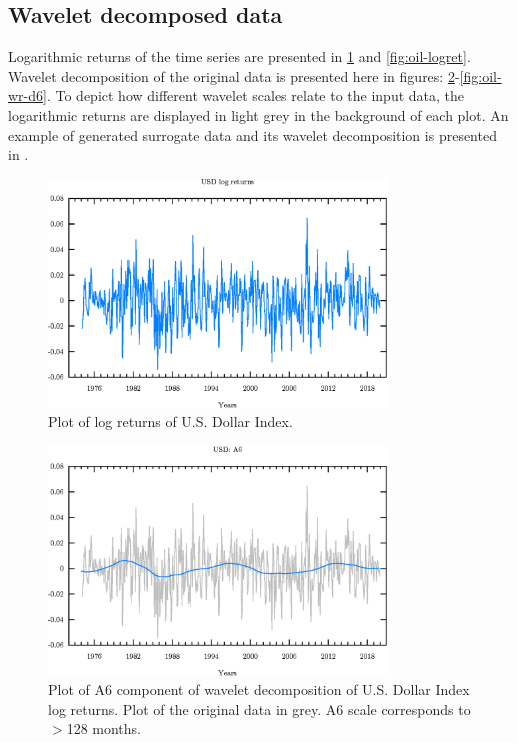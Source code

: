 \newpage
\subsection{Wavelet decomposed data}
Logarithmic returns of the time series are presented in \ref{fig:usd-logret} and \ref{fig:oil-logret}.
Wavelet decomposition of the original data is presented here in figures: \ref{fig:usd-wr-a6}-\ref{fig:oil-wr-d6}.
To depict how different wavelet scales relate to the input data, the logarithmic returns are displayed in light grey in the background of each plot.
An example of generated surrogate data and its wavelet decomposition is presented in .

\begin{figure}[h]
\begin{center}
\includegraphics[width=0.8\textwidth]{./code/plot/dollar_logret.eps}
\caption{Plot of log returns of U.S. Dollar Index.}
\label{fig:usd-logret}
\end{center}
\end{figure}

\begin{figure}
\begin{center}
\includegraphics[width=0.8\textwidth]{./code/plot/usd_wr_A6.eps}
\caption{Plot of A6 component of wavelet decomposition of U.S. Dollar Index log returns. 
	Plot of the original data in grey. A6 scale corresponds to $>$128 months.}
\label{fig:usd-wr-a6}
\end{center}
\end{figure}

